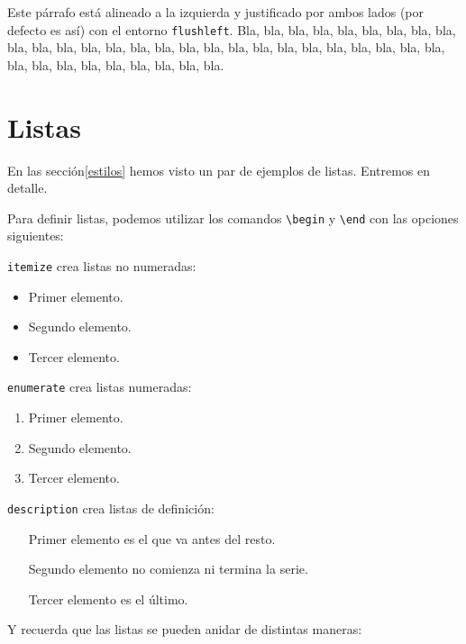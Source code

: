 \documentclass[a4paper]{article}
\begin{document}
\begin{flushleft}
Este párrafo está alineado a la izquierda y justificado por ambos lados (por defecto es así) con el entorno \texttt{flushleft}. Bla, bla, bla, bla, bla, bla, bla, bla, bla, bla, bla, bla, bla, bla, bla, bla, bla, bla, bla, bla, bla, bla, bla, bla, bla, bla, bla, bla, bla, bla, bla, bla, bla, bla, bla, bla.
\end{flushleft}


\section{Listas}
\label{listas}

En las sección\ref{estilos} hemos visto un par de ejemplos de listas. Entremos en detalle.

Para definir listas, podemos utilizar los comandos \texttt{\textbackslash begin} y \texttt{\textbackslash end} con las opciones siguientes:

\texttt{itemize} crea listas no numeradas:

\begin{itemize}
\item Primer elemento.
\item Segundo elemento.
\item Tercer elemento.
\end{itemize}

\texttt{enumerate} crea listas numeradas:

\begin{enumerate}
\item Primer elemento.
\item Segundo elemento.
\item Tercer elemento.
\end{enumerate}


\texttt{description} crea listas de definición:

\begin{enumerate}
\item[Primer elemento] es el que va antes del resto.
\item[Segundo elemento] no comienza ni termina la serie.
\item[Tercer elemento] es el último.
\end{enumerate}



Y recuerda que las listas se pueden anidar de distintas maneras:
\end{document}
